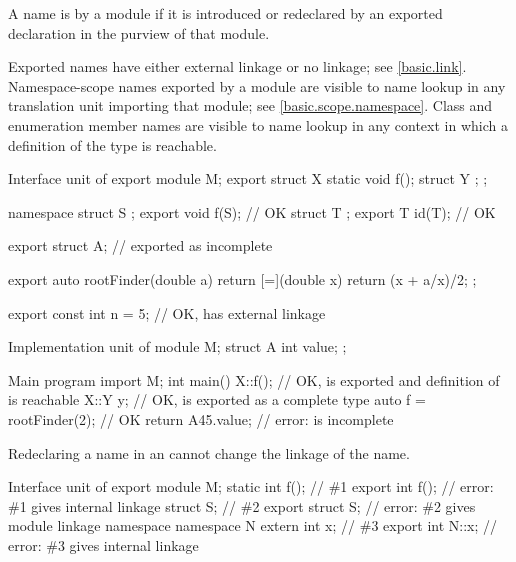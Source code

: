 \pnum
A name is  by a module
if it is introduced or redeclared
by an exported declaration in the purview of that module.
\begin{note}
Exported names have either external linkage or no linkage; see \ref{basic.link}.
Namespace-scope names exported by a module are visible to name lookup
in any translation unit importing that module; see \ref{basic.scope.namespace}.
Class and enumeration member names are visible to name lookup in any
context in which a definition of the type is reachable.
\end{note}
\begin{example}
\begin{codeblocktu}{Interface unit of }
export module M;
export struct X {
  static void f();
  struct Y { };
};

namespace {
  struct S { };
}
export void f(S);               // OK
struct T { };
export T id(T);                 // OK

export struct A;                //  exported as incomplete

export auto rootFinder(double a) {
  return [=](double x) { return (x + a/x)/2; };
}

export const int n = 5;         // OK,  has external linkage
\end{codeblocktu}

\begin{codeblocktu}{Implementation unit of }
module M;
struct A {
  int value;
};
\end{codeblocktu}

\begin{codeblocktu}{Main program}
import M;
int main() {
  X::f();                       // OK,  is exported and definition of  is reachable
  X::Y y;                       // OK,  is exported as a complete type
  auto f = rootFinder(2);       // OK
  return A{45}.value;           // error:  is incomplete
}
\end{codeblocktu}
\end{example}

\pnum
\begin{note}
Redeclaring a name in an 
cannot change the linkage of the name.
\begin{example}
\begin{codeblocktu}{Interface unit of }
export module M;
static int f();                 // \#1
export int f();                 // error: \#1 gives internal linkage
struct S;                       // \#2
export struct S;                // error: \#2 gives module linkage
namespace {
  namespace N {
    extern int x;               // \#3
  }
}
export int N::x;                // error: \#3 gives internal linkage
\end{codeblocktu}
\end{example}
\end{note}

